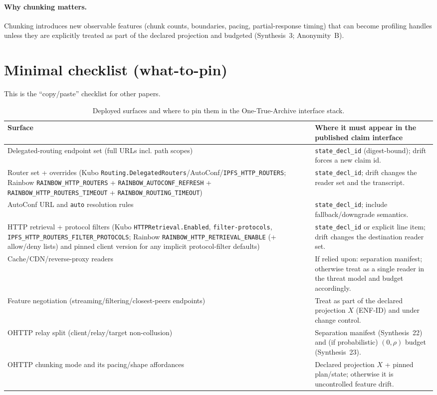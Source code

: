 \documentclass[11pt]{article}
\begin{document}
\paragraph{Why chunking matters.}
Chunking introduces new observable features (chunk counts, boundaries, pacing, partial-response timing) that can become profiling handles unless they are explicitly treated as part of the declared projection and budgeted (Synthesis~3; Anonymity~B).\cite{series:traceifaces,series:profiling}

\section{Minimal checklist (what-to-pin)}
This is the ``copy/paste'' checklist for other papers.

\begin{table}[t]
\centering
\begin{tabularx}{\linewidth}{@{}>{\raggedright\arraybackslash}X >{\raggedright\arraybackslash}X@{}}
\toprule
Surface & Where it must appear in the published claim interface \\
\midrule
Delegated-routing endpoint set (full URLs incl. path scopes) & \texttt{state\_decl\_id} (digest-bound); drift forces a new claim id. \\
Router set + overrides (Kubo \texttt{Routing.DelegatedRouters}/AutoConf/\texttt{IPFS\_HTTP\_ROUTERS}; Rainbow \texttt{RAINBOW\_HTTP\_ROUTERS} + \texttt{RAINBOW\_AUTOCONF\_\allowbreak REFRESH} + \texttt{RAINBOW\_HTTP\_ROUTERS\_\allowbreak TIMEOUT} + \texttt{RAINBOW\_ROUTING\_\allowbreak TIMEOUT}) & \texttt{state\_decl\_id}; drift changes the reader set and the transcript. \\
AutoConf URL and \texttt{auto} resolution rules & \texttt{state\_decl\_id}; include fallback/downgrade semantics. \\
HTTP retrieval + protocol filters (Kubo \texttt{HTTPRetrieval.Enabled}, \texttt{filter-protocols}, \texttt{IPFS\_HTTP\_ROUTERS\_\allowbreak FILTER\_\allowbreak PROTOCOLS}; Rainbow \texttt{RAINBOW\_HTTP\_RETRIEVAL\_ENABLE} (+ allow/deny lists) and pinned client version for any implicit protocol-filter defaults) & \texttt{state\_decl\_id} or explicit line item; drift changes the destination reader set. \\
Cache/CDN/reverse-proxy readers & If relied upon: separation manifest; otherwise treat as a single reader in the threat model and budget accordingly. \\
Feature negotiation (streaming/filtering/closest-peers endpoints) & Treat as part of the declared projection $X$ (ENF-ID) and under change control. \\
OHTTP relay split (client/relay/target non-collusion) & Separation manifest (Synthesis~22) and (if probabilistic) $(0,\rho)$ budget (Synthesis~23). \\
OHTTP chunking mode and its pacing/shape affordances & Declared projection $X$ + pinned plan/state; otherwise it is uncontrolled feature drift. \\
\bottomrule
\end{tabularx}
\caption{Deployed surfaces and where to pin them in the One-True-Archive interface stack.}
\label{tab:pinning}
\end{table}
\end{document}
